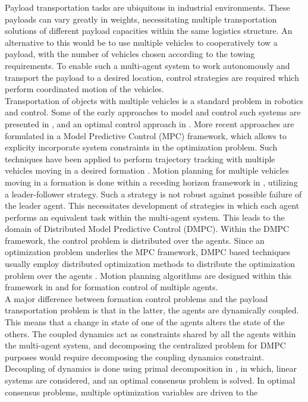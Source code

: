 \documentclass[letterpaper, 10 pt, conference]{ieeeconf}
\begin{document}
Payload transportation tasks are ubiquitous in industrial environments. These payloads can vary greatly in weights, necessitating multiple transportation solutions of different payload capacities within the same logistics structure. An alternative to this would be to use multiple vehicles to cooperatively tow a payload, with the number of vehicles chosen according to the towing requirements. To enable such a multi-agent system to work autonomously and transport the payload to a desired location, control strategies are required which perform coordinated motion of the vehicles.
\\
\indent Transportation of objects with multiple vehicles is a standard problem in robotics and control. Some of the early approaches to model and control such systems are presented in \cite{c1,c2,c3}, and an optimal control approach in \cite{c4}. More recent approaches are formulated in a Model Predictive Control (MPC) framework, which allows to explicity incorporate system constraints in the optimization problem. Such techniques have been applied to perform trajectory tracking with multiple vehicles moving in a desired formation \cite{c5}. Motion planning for multiple vehicles moving in a formation is done within a receding horizon framework in \cite{c6}, utilizing a leader-follower strategy. Such a strategy is not robust against possible failure of the leader agent. This necessitates development of strategies in which each agent performs an equivalent task within the multi-agent system. This leads to the domain of Distributed Model Predictive Control (DMPC). Within the DMPC framework, the control problem is distributed over the agents. Since an optimization problem underlies the MPC framework, DMPC based techniques usually employ distributed optimization methods to distribute the optimization problem over the agents \cite{c7}. Motion planning algorithms are designed within this framework in \cite{c8} and \cite{c16} for formation control of multiple agents.
\\
\indent
 A major difference between formation control problems and the payload transportation problem is that in the latter, the agents are dynamically coupled. This means that a change in state of one of the agents alters the state of the others. The coupled dynamics act as constraints shared by all the agents within the multi-agent system, and decomposing the centralized problem for DMPC purposes would require decomposing the coupling dynamics constraint. Decoupling of dynamics is done using primal decomposition
 in \cite{c10}, in which, linear systems are considered, and an optimal consensus problem is solved. In optimal consensus problems, multiple optimization variables are driven to the
\end{document}
